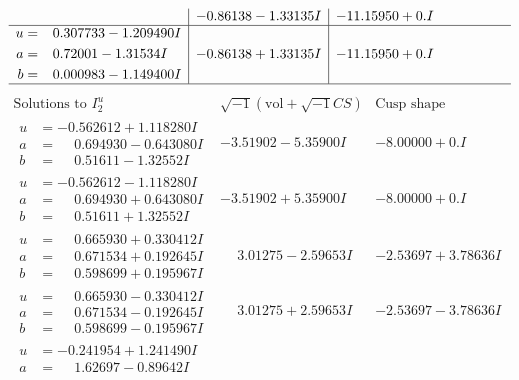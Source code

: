 \documentclass[1p]{elsarticle_modified}
\theoremstyle{definition}
\newcommand{\I}{\sqrt{-1}}
\begin{document}
$$\begin{array}{c|c|c}
 & -0.86138 - 1.33135 I & -11.15950 + 0. I\phantom{ +0.000000I} \\ \hline\begin{aligned}
u &= \phantom{-}0.307733 - 1.209490 I \\
a &= \phantom{-}0.72001 - 1.31534 I \\
b &= \phantom{-}0.000983 - 1.149400 I\end{aligned}
 & -0.86138 + 1.33135 I & -11.15950 + 0. I\phantom{ +0.000000I}\\
 \hline 
 \end{array}$$\newpage$$\begin{array}{c|c|c}  
\text{Solutions to }I^u_{2}& \I (\text{vol} + \sqrt{-1}CS) & \text{Cusp shape}\\
 \hline 
\begin{aligned}
u &= -0.562612 + 1.118280 I \\
a &= \phantom{-}0.694930 - 0.643080 I \\
b &= \phantom{-}0.51611 - 1.32552 I\end{aligned}
 & -3.51902 - 5.35900 I & -8.00000 + 0. I\phantom{ +0.000000I} \\ \hline\begin{aligned}
u &= -0.562612 - 1.118280 I \\
a &= \phantom{-}0.694930 + 0.643080 I \\
b &= \phantom{-}0.51611 + 1.32552 I\end{aligned}
 & -3.51902 + 5.35900 I & -8.00000 + 0. I\phantom{ +0.000000I} \\ \hline\begin{aligned}
u &= \phantom{-}0.665930 + 0.330412 I \\
a &= \phantom{-}0.671534 + 0.192645 I \\
b &= \phantom{-}0.598699 + 0.195967 I\end{aligned}
 & \phantom{-}3.01275 - 2.59653 I & -2.53697 + 3.78636 I \\ \hline\begin{aligned}
u &= \phantom{-}0.665930 - 0.330412 I \\
a &= \phantom{-}0.671534 - 0.192645 I \\
b &= \phantom{-}0.598699 - 0.195967 I\end{aligned}
 & \phantom{-}3.01275 + 2.59653 I & -2.53697 - 3.78636 I \\ \hline\begin{aligned}
u &= -0.241954 + 1.241490 I \\
a &= \phantom{-}1.62697 - 0.89642 I \\

\end{aligned}
\end{array}$$
\end{document}
